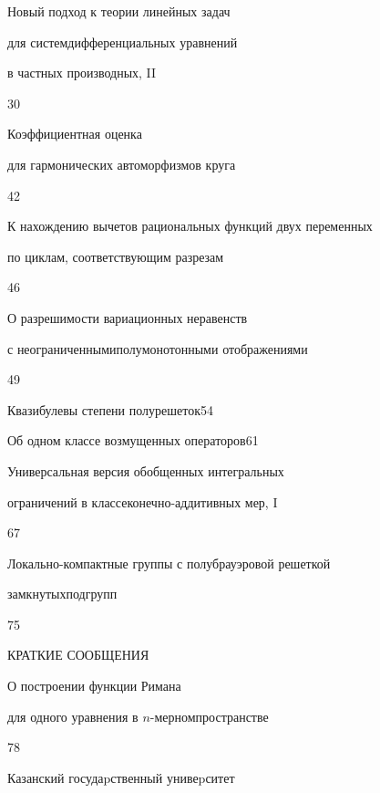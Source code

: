 

{Новый подход к теории линейных задач  


для систем\newline дифференциальных уравнений  


в частных производных, II}{30}




{Коэффициентная оценка  


для гармонических автоморфизмов круга}{42}




{К нахождению вычетов рациональных функций двух переменных\newline


по циклам, соответствующим разрезам}{46}




{О разрешимости вариационных неравенств 


с неограниченными\newline полумонотонными отображениями}{49}




{Квазибулевы степени полурешеток}{54}




{Об одном классе возмущенных операторов}{61}




{Универсальная версия обобщенных интегральных


ограничений в классе\newline конечно-аддитивных мер, I}{67}




{Локально-компактные группы с полубрауэровой решеткой 


замкнутых\newline подгрупп}{75}








\bigskip


\par


\centerline{КРАТКИЕ СООБЩЕНИЯ}


\bigskip







{О построении функции Римана


для одного уравнения в $n$-мерном\newline пространстве}{78}





\vfill


\noindent\raisebox{2pt}{\copyright} Казанский госудаpственный унивеpситет





